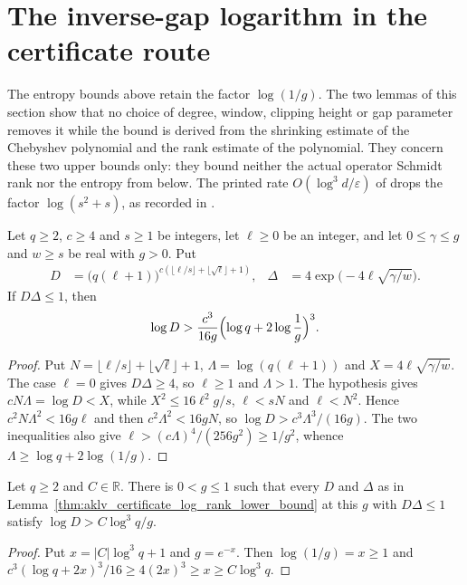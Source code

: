 \section{The inverse-gap logarithm in the certificate route}

The entropy bounds above retain the factor $\log(1/g)$. The two lemmas of this
section show that no choice of degree, window, clipping height or gap parameter
removes it while the bound is derived from the shrinking estimate of the
Chebyshev polynomial and the rank estimate of the polynomial. They concern
these two upper bounds only: they bound neither the actual operator Schmidt
rank nor the entropy from below. The printed rate $O(\log^3d/\varepsilon)$ of
\cite[Theorem~4.3]{Arad2013AreaLaw} drops the factor $\log(s^2+s)$, as
recorded in \cite{gap:aklv13_entropy_inverse_gap_logarithm}.

\begin{lemma}
    \label{thm:aklv_certificate_log_rank_lower_bound}
    \leanok
    Let $q\ge2$, $c\ge4$ and $s\ge1$ be integers, let $\ell\ge0$ be an
    integer, and let $0\le\gamma\le g$ and $w\ge s$ be real with $g>0$. Put
    \begin{align*}
        D      & =\bigl(q(\ell+1)\bigr)^{c(\lfloor\ell/s\rfloor+\lfloor\sqrt\ell\rfloor+1)}, &
        \Delta & =4\exp\bigl(-4\ell\sqrt{\gamma/w}\bigr).
    \end{align*}
    If $D\Delta\le1$, then
    \begin{align*}
        \log D>\frac{c^3}{16g}\Bigl(\log q+2\log\frac1g\Bigr)^3.
    \end{align*}
\end{lemma}
\begin{proof}
    \leanok
    Put $N=\lfloor\ell/s\rfloor+\lfloor\sqrt\ell\rfloor+1$,
    $\Lambda=\log(q(\ell+1))$ and $X=4\ell\sqrt{\gamma/w}$. The case $\ell=0$
    gives $D\Delta\ge4$, so $\ell\ge1$ and $\Lambda>1$. The hypothesis gives
    $cN\Lambda=\log D<X$, while $X^2\le16\ell^2g/s$, $\ell<sN$ and $\ell<N^2$.
    Hence $c^2N\Lambda^2<16g\ell$ and then $c^2\Lambda^2<16gN$, so
    $\log D>c^3\Lambda^3/(16g)$. The two inequalities also give
    $\ell>(c\Lambda)^4/(256g^2)\ge1/g^2$, whence
    $\Lambda\ge\log q+2\log(1/g)$.
\end{proof}

\begin{lemma}
    \label{thm:aklv_certificate_not_uniform_log_cube}
    \leanok
    Let $q\ge2$ and $C\in\mathbb R$. There is $0<g\le1$ such that every
    $D$ and $\Delta$ as in
    Lemma~\ref{thm:aklv_certificate_log_rank_lower_bound} at this $g$ with
    $D\Delta\le1$ satisfy $\log D>C\log^3q/g$.
\end{lemma}
\begin{proof}
    \leanok
    Put $x=|C|\log^3q+1$ and $g=e^{-x}$. Then $\log(1/g)=x\ge1$ and
    $c^3(\log q+2x)^3/16\ge4(2x)^3\ge x\ge C\log^3q$.
\end{proof}
